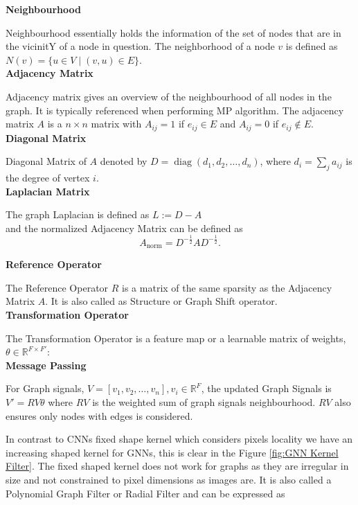 \documentclass{report} %
\begin{document}
\textbf{Neighbourhood}

Neighbourhood essentially holds the information of the set of nodes that are in the vicinitY of a node in question.
The neighborhood of a node \( v \) is defined as \( N(v) = \{ u \in V \mid (v, u) \in E \} \).\\

\textbf{Adjacency Matrix}

Adjacency matrix gives an overview of the neighbourhood of all nodes in the graph. It is typically referenced when performing \ac{MP} algorithm.
The adjacency matrix \( A \) is a \( n \times n \) matrix with \( A_{ij} = 1 \) if \( e_{ij} \in E \) and \( A_{ij} = 0 \) if \( e_{ij} \notin E \).\\

\textbf{Diagonal Matrix} 

Diagonal Matrix of \( A \) denoted by  \( D = \operatorname{diag}(d_1, d_2, \dots, d_n) \), where \( d_i = \sum_{j} a_{ij} \) is the degree of vertex \( i \).\\

\textbf{Laplacian Matrix}

The graph Laplacian is defined as \( L := D - A \) \\ and the normalized Adjacency Matrix can be defined as
\[
A_{\text{norm}} = D^{-\frac{1}{2}} A D^{-\frac{1}{2}}.
\]

\textbf{Reference Operator}

The Reference Operator \( R \) is a matrix of the same sparsity as the Adjacency Matrix \( A \). It is also called as Structure or Graph Shift operator.\\

\textbf{Transformation Operator}

The Transformation Operator is a feature map or a learnable matrix of weights, \( \theta \in \mathbb{R}^{F \times F'} \):\\

\textbf{Message Passing}

For Graph signals, \( V = [v_1, v_2, \dots, v_n], v_i  \in \mathbb{R}^F \), the updated Graph Signals is \( V' = RV\theta \) 
where \( RV \) is the weighted sum of graph signals neighbourhood. \( RV \) also ensures only nodes with edges is considered.

In contrast to \ac{CNN}s fixed shape kernel which considers pixels locality we have an increasing shaped kernel for \ac{GNN}s, this is clear in the Figure \ref{fig:GNN Kernel Filter}. 
The fixed shaped kernel does not work for graphs  as they are irregular in size and not constrained to pixel dimensions as images are. 
It is also called a Polynomial Graph Filter or Radial Filter and can be expressed as
\end{document}

